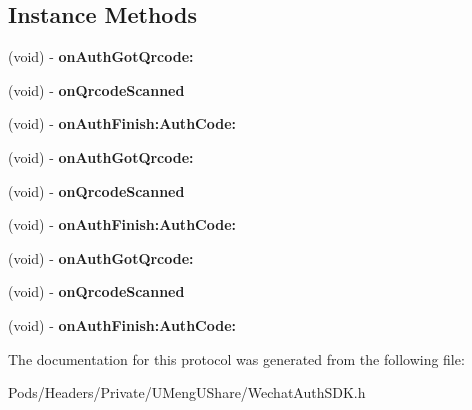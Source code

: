 \subsection*{Instance Methods}
\begin{DoxyCompactItemize}
\item 
\mbox{\label{protocol_wechat_auth_a_p_i_delegate-p_ae736482638ea066f743670ae23ce08c1}} 
(void) -\/ {\bfseries on\+Auth\+Got\+Qrcode\+:}
\item 
\mbox{\label{protocol_wechat_auth_a_p_i_delegate-p_a8d6a529d026496136b938acec823a529}} 
(void) -\/ {\bfseries on\+Qrcode\+Scanned}
\item 
\mbox{\label{protocol_wechat_auth_a_p_i_delegate-p_acb21c461f9b04d2f403d1c0bdb1f35fb}} 
(void) -\/ {\bfseries on\+Auth\+Finish\+:\+Auth\+Code\+:}
\item 
\mbox{\label{protocol_wechat_auth_a_p_i_delegate-p_ae736482638ea066f743670ae23ce08c1}} 
(void) -\/ {\bfseries on\+Auth\+Got\+Qrcode\+:}
\item 
\mbox{\label{protocol_wechat_auth_a_p_i_delegate-p_a8d6a529d026496136b938acec823a529}} 
(void) -\/ {\bfseries on\+Qrcode\+Scanned}
\item 
\mbox{\label{protocol_wechat_auth_a_p_i_delegate-p_acb21c461f9b04d2f403d1c0bdb1f35fb}} 
(void) -\/ {\bfseries on\+Auth\+Finish\+:\+Auth\+Code\+:}
\item 
\mbox{\label{protocol_wechat_auth_a_p_i_delegate-p_ae736482638ea066f743670ae23ce08c1}} 
(void) -\/ {\bfseries on\+Auth\+Got\+Qrcode\+:}
\item 
\mbox{\label{protocol_wechat_auth_a_p_i_delegate-p_a8d6a529d026496136b938acec823a529}} 
(void) -\/ {\bfseries on\+Qrcode\+Scanned}
\item 
\mbox{\label{protocol_wechat_auth_a_p_i_delegate-p_acb21c461f9b04d2f403d1c0bdb1f35fb}} 
(void) -\/ {\bfseries on\+Auth\+Finish\+:\+Auth\+Code\+:}
\end{DoxyCompactItemize}


The documentation for this protocol was generated from the following file\+:\begin{DoxyCompactItemize}
\item 
Pods/\+Headers/\+Private/\+U\+Meng\+U\+Share/Wechat\+Auth\+S\+D\+K.\+h\end{DoxyCompactItemize}
